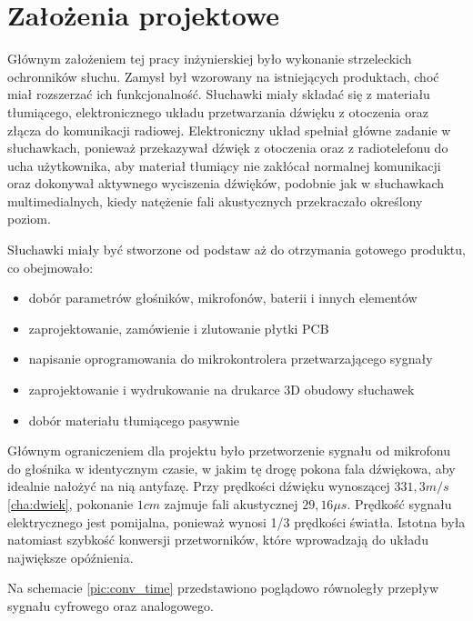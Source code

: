 \chapter{Założenia projektowe}
\label{cha: zalozeniaprojektowe}

Głównym założeniem tej pracy inżynierskiej było wykonanie strzeleckich ochronników słuchu. Zamysł był wzorowany na istniejących produktach, choć miał rozszerzać ich funkcjonalność. Słuchawki miały składać się z materiału tłumiącego, elektronicznego układu przetwarzania dźwięku z otoczenia oraz złącza do komunikacji radiowej. Elektroniczny układ spełniał główne zadanie w słuchawkach, ponieważ przekazywał dźwięk z otoczenia oraz z radiotelefonu do ucha użytkownika, aby materiał tłumiący nie zakłócał normalnej komunikacji oraz dokonywał aktywnego wyciszenia dźwięków, podobnie jak w słuchawkach multimedialnych, kiedy natężenie fali akustycznych przekraczało określony poziom.

Słuchawki miały być stworzone od podstaw aż do otrzymania gotowego produktu, co obejmowało:

\begin{itemize}
	\item dobór parametrów głośników, mikrofonów, baterii i innych elementów
	\item zaprojektowanie, zamówienie i zlutowanie płytki PCB
	\item napisanie oprogramowania do mikrokontrolera przetwarzającego sygnały
	\item zaprojektowanie i wydrukowanie na drukarce 3D obudowy słuchawek
	\item dobór materiału tłumiącego pasywnie
\end{itemize}

Głównym ograniczeniem dla projektu było przetworzenie sygnału od mikrofonu do głośnika w identycznym czasie, w jakim tę drogę pokona fala dźwiękowa, aby idealnie nałożyć na nią antyfazę. Przy prędkości dźwięku wynoszącej $ 331,3m/s $\ref{cha:dwiek}, pokonanie $1cm$ zajmuje fali akustycznej $29,16\mu s$. Prędkość sygnału elektrycznego jest pomijalna, ponieważ wynosi 1/3 prędkości światła. Istotna była natomiast szybkość konwersji przetworników, które wprowadzają do układu największe opóźnienia.

Na schemacie \ref{pic:conv_time} przedstawiono poglądowo równoległy przepływ sygnału cyfrowego oraz analogowego.

